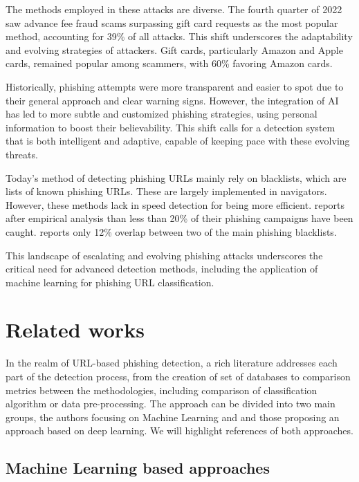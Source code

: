 \documentclass{article}
\begin{document}
    The methods employed in these attacks are diverse.
    The fourth quarter of 2022 saw advance fee fraud scams surpassing gift card requests as the most popular method, accounting for 39\% of all attacks.
    This shift underscores the adaptability and evolving strategies of attackers.
    Gift cards, particularly Amazon and Apple cards, remained popular among scammers, with 60\% favoring Amazon cards.

    Historically, phishing attempts were more transparent and easier to spot due to their general approach and clear warning signs.
    However, the integration of AI has led to more subtle and customized phishing strategies, using personal information to boost their believability.
    This shift calls for a detection system that is both intelligent and adaptive, capable of keeping pace with these evolving threats.

    Today's method of detecting phishing URLs mainly rely on blacklists, which are lists of known phishing URLs.
    These are largely implemented in navigators.
    However, these methods lack in speed detection for being more efficient.
    \cite{PhishingExperimentalBlackLists2009} reports after empirical analysis than less than 20\% of their phishing campaigns have been caught.
    \cite{PhishingBlackLists} reports only 12\% overlap between two of the main phishing blacklists.

    This landscape of escalating and evolving phishing attacks underscores the critical need for advanced detection methods, including the application of machine learning for phishing URL classification.


    \section{Related works}\label{sec:related-works}

    In the realm of URL-based phishing detection, a rich literature addresses each part of the detection process, from the creation of set of databases to comparison metrics between the methodologies, including comparison of classification algorithm or data pre-processing.
    The approach can be divided into two main groups, the authors focusing on Machine Learning and and those proposing an approach based on deep learning.
    We will highlight references of both approaches.

    \subsection{Machine Learning based approaches}\label{subsec:machine-learning-based-approaches}
\end{document}
